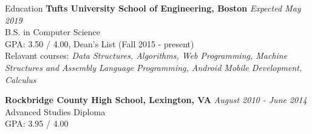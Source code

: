 \documentclass{resume}
\begin{document}
  \begin{rSection}{Education}
    {\bf Tufts University School of Engineering, Boston} \hfill {\em Expected May 2019} \\ 
    { B.S. in Computer Science} \\
    GPA: 3.50 / 4.00, Dean's List (Fall 2015 - present)\\
    Relavant courses: \textit{Data Structures, Algorithms, Web Programming, Machine Structures and Assembly Language Programming, Android Mobile Development, Calculus}
    
    {\bf Rockbridge County High School, Lexington, VA} \hfill {\em  August 2010 - June 2014} \\ 
    {Advanced Studies Diploma} \\
    GPA: 3.95 / 4.00
  \end{rSection}
  
\end{document}
